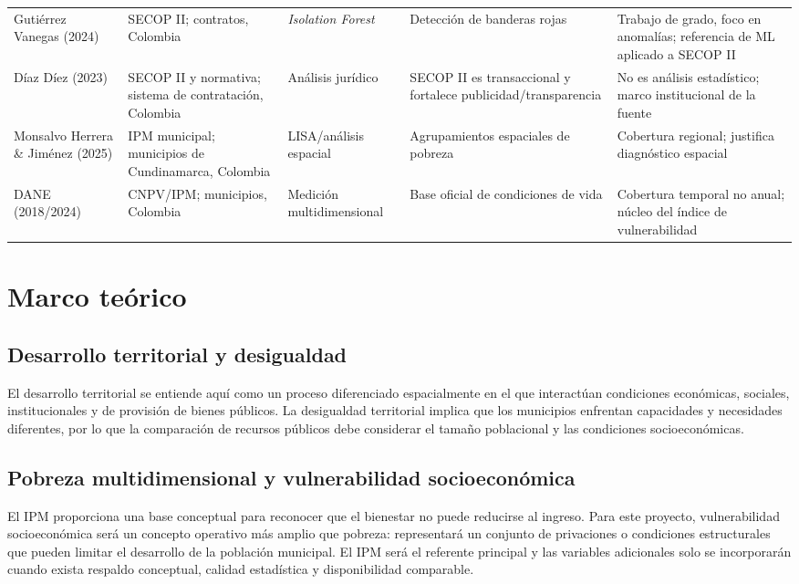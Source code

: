 \documentclass[11pt,letterpaper]{article}
\begin{document}
\begin{center}
\begin{longtable}{p{2.1cm}p{3.0cm}p{3.0cm}p{3.6cm}p{3.6cm}}
Gutiérrez Vanegas (2024) & SECOP II; contratos, Colombia & \textit{Isolation Forest} & Detección de banderas rojas & Trabajo de grado, foco en anomalías; referencia de ML aplicado a SECOP II \\
Díaz Díez (2023) & SECOP II y normativa; sistema de contratación, Colombia & Análisis jurídico & SECOP II es transaccional y fortalece publicidad/transparencia & No es análisis estadístico; marco institucional de la fuente \\
Monsalvo Herrera \& Jiménez (2025) & IPM municipal; municipios de Cundinamarca, Colombia & LISA/análisis espacial & Agrupamientos espaciales de pobreza & Cobertura regional; justifica diagnóstico espacial \\
DANE (2018/2024) & CNPV/IPM; municipios, Colombia & Medición multidimensional & Base oficial de condiciones de vida & Cobertura temporal no anual; núcleo del índice de vulnerabilidad \\
\bottomrule
\end{longtable}
\end{center}

\section{Marco teórico}

\subsection{Desarrollo territorial y desigualdad}

El desarrollo territorial se entiende aquí como un proceso diferenciado
espacialmente en el que interactúan condiciones económicas, sociales,
institucionales y de provisión de bienes públicos. La desigualdad territorial
implica que los municipios enfrentan capacidades y necesidades diferentes, por
lo que la comparación de recursos públicos debe considerar el tamaño
poblacional y las condiciones socioeconómicas.

\subsection{Pobreza multidimensional y vulnerabilidad socioeconómica}

El IPM proporciona una base conceptual para reconocer que el bienestar no puede
reducirse al ingreso. Para este proyecto, vulnerabilidad socioeconómica será un
concepto operativo más amplio que pobreza: representará un conjunto de
privaciones o condiciones estructurales que pueden limitar el desarrollo de la
población municipal. El IPM será el referente principal y las variables
adicionales solo se incorporarán cuando exista respaldo conceptual, calidad
estadística y disponibilidad comparable.
\end{document}
